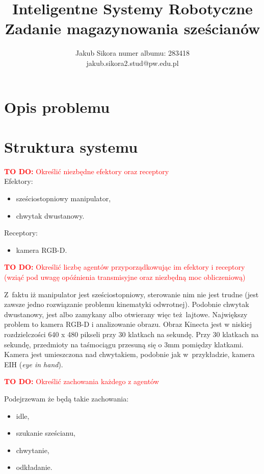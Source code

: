 \documentclass{article}
\title{Inteligentne Systemy Robotyczne \\ Zadanie magazynowania sześcianów}
\author{
Jakub Sikora
\affiliations
numer albumu: 283418 \\
\emails
jakub.sikora2.stud@pw.edu.pl
}
\newcommand{\todo}[1]{\textcolor{red}{\textbf{TO DO:} #1}}
\begin{document}
\maketitle

\section{Opis problemu}
\label{sec:opis-problemu}


\section{Struktura systemu}
\label{sec:struktura}


\todo{Określić niezbędne efektory oraz receptory} \\
Efektory: 
\begin{itemize}
    \item sześciostopniowy manipulator,
    \item chwytak dwustanowy.
\end{itemize}

Receptory:
\begin{itemize}
    \item kamera RGB-D.
\end{itemize}

\todo{Określić liczbę agentów przyporządkowując im efektory i
receptory (wziąć pod uwagę opóźnienia transmisyjne oraz
niezbędną moc obliczeniową)}

Z~faktu iż manipulator jest sześciostopniowy, sterowanie nim nie jest trudne (jest zawsze jedno rozwiązanie problemu kinematyki odwrotnej). Podobnie chwytak dwustanowy, jest albo zamykany albo otwierany więc też lajtowe. Największy problem to kamera RGB-D i analizowanie obrazu. Obraz Kinecta jest w niskiej rozdzielczości 640 x 480 pikseli przy 30 klatkach na sekundę. Przy 30 klatkach na sekundę, przedmioty na taśmociągu przesuną się o 3mm pomiędzy klatkami. Kamera jest umieszczona nad chwytakiem, podobnie jak w~przykładzie, kamera EIH (\emph{eye in hand}).

\todo{Określić zachowania każdego z agentów}

Podejrzewam że będą takie zachowania: 
\begin{itemize}
    \item idle,
    \item szukanie sześcianu,
    \item chwytanie,
    \item odkładanie.
\end{itemize}
\end{document}

